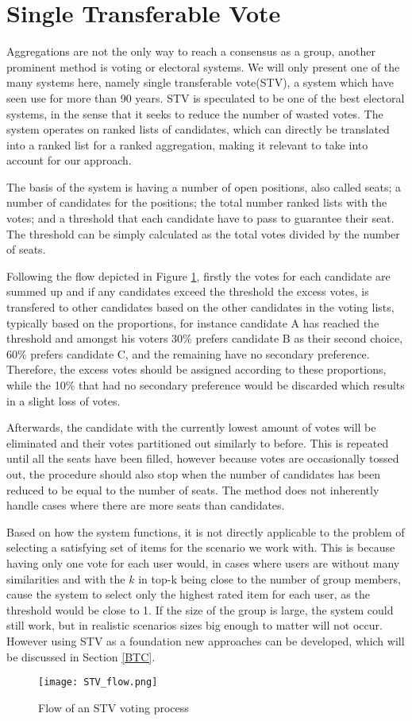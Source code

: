 \section{Single Transferable Vote} \label{sec:stv}
Aggregations are not the only way to reach a consensus as a group, another prominent method is voting or electoral systems. We will only present one of the many systems here, namely single transferable vote(STV), a system which have seen use for more than 90 years\cite{stvireland}.
STV is speculated to be one of the best electoral systems, in the sense that it seeks to reduce the number of wasted votes. The system operates on ranked lists of candidates, which can directly be translated into a ranked list for a ranked aggregation, making it relevant to take into account for our approach.

The basis of the system is having a number of open positions, also called seats; a number of candidates for the positions; the total number ranked lists with the votes; and a threshold that each candidate have to pass to guarantee their seat. The threshold can be simply calculated as the total votes divided by the number of seats\cite{stv}.

Following the flow depicted in Figure \ref{fig:stvflow}, firstly the votes for each candidate are summed up and if any candidates exceed the threshold the excess votes, is transfered to other candidates based on the other candidates in the voting lists, typically based on the proportions, for instance candidate A has reached the threshold and amongst his voters 30\% prefers candidate B as their second choice, 60\% prefers candidate C, and the remaining have no secondary preference. Therefore, the excess votes should be assigned according to these proportions, while the 10\% that had no secondary preference would be discarded which results in a slight loss of votes.

Afterwards, the candidate with the currently lowest amount of votes will be eliminated and their votes partitioned out similarly to before. This is repeated until all the seats have been filled, however because votes are occasionally tossed out, the procedure should also stop when the number of candidates has been reduced to be equal to the number of seats. The method does not inherently handle cases where there are more seats than candidates.

Based on how the system functions, it is not directly applicable to the problem of selecting a satisfying set of items for the scenario we work with. This is because having only one vote for each user would, in cases where users are without many similarities and with the $k$ in top-k being close to the number of group members, cause the system to select only the highest rated item for each user, as the threshold would be close to 1. If the size of the group is large, the system could still work, but in realistic scenarios sizes big enough to matter will not occur. However using STV as a foundation new approaches can be developed, which will be discussed in Section \ref{BTC}.

\begin{figure}
	\centering
	\texttt{[image: STV\_flow.png]}
	\caption{Flow of an STV voting process}
	\label{fig:stvflow}
\end{figure}